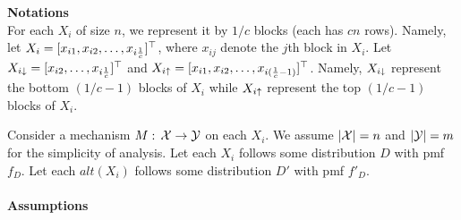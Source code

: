 \documentclass[11pt]{article}
\begin{document}
\\
\\
{\bf Notations }\\
For each $X_i$ of size $n$, we represent it by $1/c$ blocks (each has $cn$ rows). Namely, let $X_{i}=[x_{i 1}, x_{i 2} , \dots, x_{i \frac{1}{c}}]^{\top}$, where $x_{ij}$ denote the $j$th block in $X_{i}$. Let $X_{i \downarrow} = [x_{i 2} , \dots, x_{i \frac{1}{c}}]^{\top}$ and $X_{i \uparrow} = [x_{i 1}, x_{i2} , \dots, x_{i (\frac{1}{c}-1)}]^{\top}$. Namely, $X_{i \downarrow}$ represent the bottom $(1/c -1)$ blocks of $X_{i}$ while $X_{i \uparrow}$ represent the top $(1/c-1)$ blocks of $X_{i}$.

Consider a mechanism $M: \, {\cal X} \rightarrow {\cal Y}$ on each $X_{i}$. We assume $|{\cal X}| =n$ and $|{\cal Y}|=m$ for the simplicity of analysis. Let each $X_{i}$ follows some distribution $D$ with pmf $f_{D}$. Let each $alt(X_{i})$ follows some distribution $D'$ with pmf $f'_{D}$.
\\
\\
{\bf Assumptions}
\end{document}

